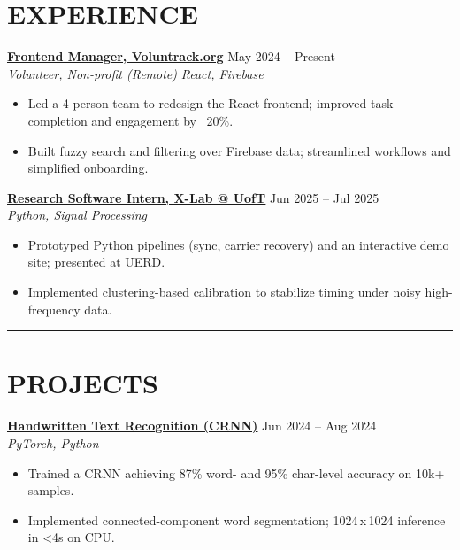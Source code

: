 \documentclass[letterpaper,10pt]{article}
\begin{document}
\section*{\textbf{EXPERIENCE}}
\noindent\href{https://volun-track.web.app}{\uline{\textbf{Frontend Manager, Voluntrack.org}}} \hfill May 2024 -- Present\\
\textit{Volunteer, Non-profit (Remote)} \quad \textit{React, Firebase}
\begin{itemize}
    \item Led a 4-person team to redesign the React frontend; improved task completion and engagement by ~20\%.
    \item Built fuzzy search and filtering over Firebase data; streamlined workflows and simplified onboarding.
\end{itemize}

\vspace{0.2cm}
\noindent\href{https://github.com/Ken-2511/ppm-psk-visualize}{\uline{\textbf{Research Software Intern, X-Lab @ UofT}}} \hfill Jun 2025 -- Jul 2025\\
\textit{Python, Signal Processing}
\begin{itemize}
    \item Prototyped Python pipelines (sync, carrier recovery) and an interactive demo site; presented at UERD.
    \item Implemented clustering-based calibration to stabilize timing under noisy high-frequency data.
\end{itemize}

\noindent\rule{\linewidth}{1pt}

\section*{\textbf{PROJECTS}}
\noindent\href{https://github.com/Ken-2511/HandwritingRecognition}{\uline{\textbf{Handwritten Text Recognition (CRNN)}}} \hfill Jun 2024 -- Aug 2024\\
\textit{PyTorch, Python}
\begin{itemize}
    \item Trained a CRNN achieving 87\% word- and 95\% char-level accuracy on 10k+ samples.
    \item Implemented connected-component word segmentation; 1024\,x\,1024 inference in <4s on CPU.
\end{itemize}
\end{document}

